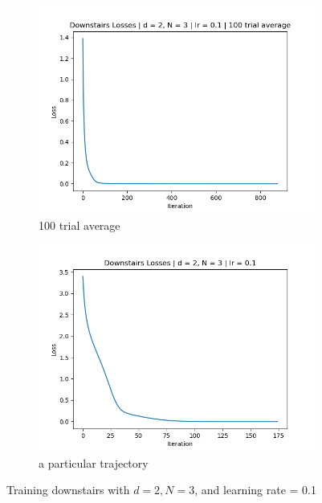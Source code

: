 \documentclass[11pt]{article}
\begin{document}
\begin{figure}[ht]
    \begin{subfigure}{0.5\textwidth}
        \centering
        \includegraphics[width=\textwidth]{images/downstairs_avg.png}
        \caption{100 trial average}
        \label{fig:downstairs_avg}
    \end{subfigure}
    \begin{subfigure}{0.5\textwidth}
        \centering
        \includegraphics[width=\textwidth]{images/downstairs_1.png}
        \caption{a particular trajectory}
        \label{fig:downstairs_1}
    \end{subfigure}
    \caption{Training downstairs with $d = 2, N = 3$, and learning rate = 0.1}
    \label{fig:downstairs}
\end{figure}
\end{document}
